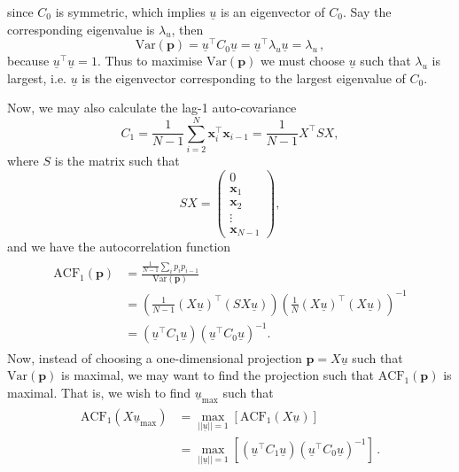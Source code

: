 since $C_0$ is symmetric, which implies $\underline{u}$ is an eigenvector of $C_0$. Say the corresponding eigenvalue is $\lambda_u$, then
	\begin{equation}
		\text{Var}(\mathbf{p}) = \underline{u}^\top C_0 \underline{u} = \underline{u}^\top \lambda_u \underline{u} = \lambda_u\, ,
	\end{equation}
because $\underline{u}^\top \underline{u}=1$. Thus to maximise $\text{Var}(\mathbf{p})$ we must choose $\underline{u}$ such that $\lambda_u$ is largest, i.e. $\underline{u}$ is the eigenvector corresponding to the largest eigenvalue of $C_0$.

Now, we may also calculate the lag-1 auto-covariance 
	\begin{equation}
		C_1 = \frac{1}{N-1}\sum_{i=2}^{N} \mathbf{x}_i^\top\mathbf{x}_{i-1} = \frac{1}{N-1}X^\top SX,
	\end{equation}
where $S$ is the matrix such that 
	\begin{equation}
		SX = \left(\begin{array}{cc}
		0\\
		\mathbf{x}_1\\
		\mathbf{x}_2\\
		\vdots\\
		\mathbf{x}_{N-1}
		\end{array}\right),
	\end{equation}
and we have the autocorrelation function 
	\begin{align}
		\begin{split}
		\text{ACF}_1(\mathbf{p}) &= \frac{\frac{1}{N-1}\sum_i p_i p_{i-1}}{\text{Var}(\mathbf{p})}\\
		&= \left(\frac{1}{N-1} (X\underline{u})^\top(SX\underline{u}) \right)\left(\frac{1}{N} (X\underline{u})^\top(X\underline{u}) \right)^{-1}\\
		&= \left( \underline{u}^\top C_1\underline{u} \right) \left(\underline{u}^\top C_0 \underline{u}\right)^{-1}.
		\end{split}
		\label{eqn:2D:maxVector_EOFalt}
	\end{align}
Now, instead of choosing a one-dimensional projection $\mathbf{p} = X\underline{u}$ such that $\text{Var}(\mathbf{p})$ is maximal, we may want to find the projection such that $\text{ACF}_1(\mathbf{p})$ is maximal. That is, we wish to find $\underline{u}_\text{max}$ such that
	\begin{align}
	\label{eqn:2D:maximumACFunitvector} 
	\begin{split}
		\text{ACF}_1(X\underline{u}_\text{max})
		 &= \max_{||\underline{u}||=1}\left[\text{ACF}_1(X\underline{u})\right]\\
		 &= \max_{||\underline{u}||=1}\left[\left( \underline{u}^\top C_1\underline{u} \right) \left(\underline{u}^\top C_0 \underline{u}\right)^{-1}\right]\,.
	\end{split}
	\end{align}
